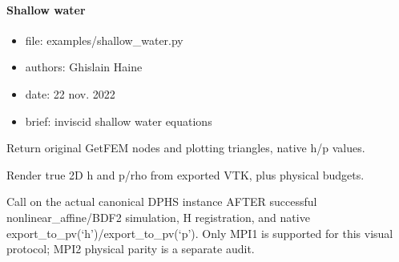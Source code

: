 \documentclass[letterpaper,10pt,english]{sphinxmanual}
\begin{document}
\paragraph{Shallow water}
\label{\detokenize{scrimp.examples:shallow-water}}\begin{itemize}
\item {} 
\sphinxAtStartPar
file:             examples/shallow\_water.py

\item {} 
\sphinxAtStartPar
authors:          Ghislain Haine

\item {} 
\sphinxAtStartPar
date:             22 nov. 2022

\item {} 
\sphinxAtStartPar
brief:            inviscid shallow water equations

\end{itemize}


\begin{fulllineitems}

\pysigstartsignatures
\pysiglinewithargsret
{}
{\sphinxparamcomma {}}
{}
\pysigstopsignatures
\sphinxAtStartPar
Return original GetFEM nodes and plotting triangles, native h/p values.

\end{fulllineitems}



\begin{fulllineitems}

\pysigstartsignatures
\pysiglinewithargsret
{}
{\sphinxparamcomma {}\sphinxparamcomma {}\sphinxparamcomma {}\sphinxparamcomma {}}
{}
\pysigstopsignatures
\sphinxAtStartPar
Render true 2\sphinxhyphen{}D h and p/rho from exported VTK, plus physical budgets.

\sphinxAtStartPar
Call on the actual canonical DPHS instance AFTER successful
nonlinear\_affine/BDF2 simulation, H registration, and native
export\_to\_pv(‘h’)/export\_to\_pv(‘p’). Only MPI1 is supported for
this visual protocol; MPI2 physical parity is a separate audit.

\end{fulllineitems}
\end{document}
